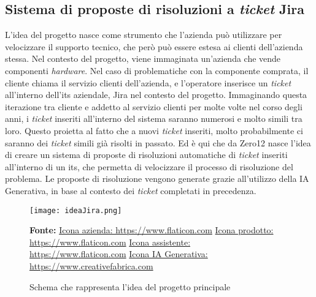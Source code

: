 \subsection{Sistema di proposte di risoluzioni a \textit{ticket} Jira} \label{sec:spiegazioneJira}
L'idea del progetto nasce come strumento che l'azienda può utilizzare per velocizzare il supporto tecnico, che però può essere estesa ai clienti dell'azienda stessa. Nel contesto del progetto, viene immaginata un'azienda che vende componenti \textit{hardware}. 
Nel caso di problematiche con la componente comprata, il cliente chiama il servizio clienti dell'azienda, e l'operatore inserisce un \textit{ticket} all'interno dell'\gls{its} aziendale, Jira nel contesto del progetto. Immaginando questa iterazione tra cliente e addetto al servizio clienti per molte volte nel corso degli anni, i \textit{ticket} inseriti all'interno del sistema saranno numerosi e molto simili tra loro. 
Questo proietta al fatto che a nuovi \textit{ticket} inseriti, molto probabilmente ci saranno dei \textit{ticket} simili già risolti in passato. 
Ed è qui che da Zero12 nasce l'idea di creare un sistema di proposte di risoluzioni automatiche di \textit{ticket} inseriti all'interno di un \gls{its}, che permetta di velocizzare il processo di risoluzione del problema. Le proposte di risoluzione vengono generate grazie all'utilizzo della IA Generativa, in base al contesto dei \textit{ticket} completati in precedenza.

\begin{figure}[H]
    \centering
    \texttt{[image: ideaJira.png]}
    \caption{Schema che rappresenta l'idea del progetto principale}
    \small \textbf{Fonte:} \href{https://www.flaticon.com/free-icon/company_4812244}{Icona azienda: https://www.flaticon.com} \href{https://www.flaticon.com/free-icon/box_4601560}{Icona prodotto: https://www.flaticon.com} \href{https://www.flaticon.com/free-icon/assistant_1442194}{Icona assistente: https://www.flaticon.com} \href{https://www.creativefabrica.com/it/product/ai-brain-outline-icon/} {Icona IA Generativa: https://www.creativefabrica.com}

    \label{fig:ideaJira}
\end{figure}
